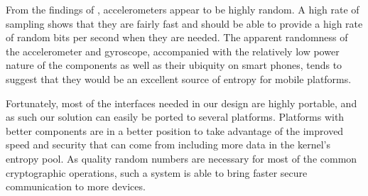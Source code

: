 
From the findings of \cite{voris}, accelerometers appear to be highly random. A
high rate of sampling shows that they are fairly fast and should be able to
provide a high rate of random bits per second when they are needed.
The apparent randomness of the accelerometer and gyroscope, accompanied with the
relatively low power nature of the components as well as their ubiquity on smart
phones, tends to suggest that they would be an excellent source of entropy for
mobile platforms. 

Fortunately, most of the interfaces needed in our design are highly portable,
and as such our solution can easily be ported to several platforms. Platforms
with better components are in a better position to take advantage of the
improved speed and security that can come from including more data in the
kernel's entropy pool.  As quality random numbers are necessary for most of the
common cryptographic operations, such a system is able to bring faster
secure communication to more devices. 
